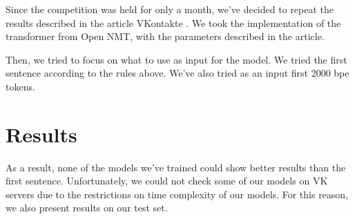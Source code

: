 \documentclass{dialogue}
\begin{document}
Since the competition was held for only a month, we've decided to repeat the results described in the article VKontakte \cite{gavrilov2018self}. We took the implementation of the transformer from Open NMT, with the parameters described in the article.

Then, we tried to focus on what to use as input for the model. We tried the first sentence according to the rules above. We've also tried as an input first 2000 bpe tokens.

\section{Results}

As a result, none of the models we've trained could show better results than the first sentence. Unfortunately, we could not check some of our models on VK servers due to the restrictions on time complexity of our models. For this reason, we also present results on our test set.
\end{document}
